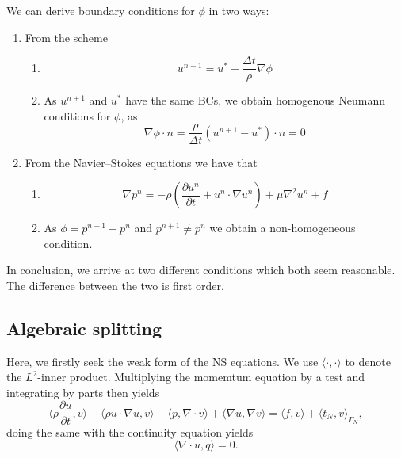 We can derive boundary conditions for $\phi$ in two ways:
\begin{enumerate}
    \item From the scheme
        \begin{enumerate}
            \item \[
                    u^{n + 1} = u^* - \frac{\Delta t}{\rho} \nabla \phi
                \]

            \item As $u^{n+1}$ and $u^*$ have the same BCs, we obtain homogenous Neumann conditions for $\phi$, as
                \begin{equation}
                    \nabla \phi \cdot n = \frac{\rho}{\Delta t} (u^{n + 1} - u^*) \cdot n = 0
                \end{equation}
        \end{enumerate}

    \item From the Navier--Stokes equations we have that %
        \begin{enumerate}
            \item \[
                    \nabla p^n = - \rho\left(
                        \frac{\partial u^n}{\partial t} + u^n \cdot \nabla u^n
                    \right) + \mu\nabla^2 u^n + f
                \]

            \item As $\phi = p^{n+1} - p^n$ and \( p^{n + 1} \neq p^n \) we obtain a non-homogeneous condition.
        \end{enumerate}
\end{enumerate}
In conclusion, we arrive at two different conditions which both seem reasonable.
The difference between the two is first order.

\subsection{Algebraic splitting}
Here, we firstly seek the weak form of the NS equations.
We use \( \langle \cdot, \cdot \rangle \) to denote the \(L^2\)-inner product.
Multiplying the momemtum equation by a test and integrating by parts then yields
\begin{equation}
    \langle \rho \frac{\partial u}{\partial t} , v \rangle
    + \langle \rho u \cdot \nabla u, v \rangle
    - \langle p, \nabla \cdot v \rangle
    + \langle \nabla u, \nabla v \rangle
    = \langle f, v \rangle + \langle t_N, v \rangle_{\Gamma_N},
\end{equation}
doing the same with the continuity equation yields
\begin{equation}
    \langle \nabla \cdot u, q \rangle = 0.
\end{equation}
